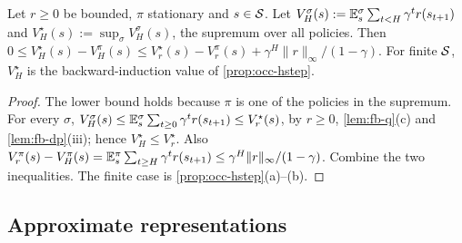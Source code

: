 \begin{corollary}\label{cor:fb-hstep}
Let $r\ge0$ be bounded, $\pi$ stationary and $s\in\mathcal{S}$.
Let $V^\sigma_H(s):=\mathbb{E}^\sigma_s\sum_{t<H}\gamma^tr(s_{t+1})$ and $V^\star_H(s):=\sup_\sigma V^\sigma_H(s)$, the supremum over all policies.
Then $0\le V^\star_H(s)-V^\pi_H(s)\le V^\star_r(s)-V^\pi_r(s)+\gamma^H\|r\|_\infty/(1-\gamma)$.
For finite $\mathcal{S}$, $V^\star_H$ is the backward-induction value of \cref{prop:occ-hstep}.
\end{corollary}
\begin{proof}
The lower bound holds because $\pi$ is one of the policies in the supremum.
For every $\sigma$, $V^\sigma_H(s)\le\mathbb{E}^\sigma_s\sum_{t\ge0}\gamma^tr(s_{t+1})\le V^\star_r(s)$, by $r\ge0$, \cref{lem:fb-q}(c) and \cref{lem:fb-dp}(iii); hence $V^\star_H\le V^\star_r$.
Also $V^\pi_r(s)-V^\pi_H(s)=\mathbb{E}^\pi_s\sum_{t\ge H}\gamma^tr(s_{t+1})\le\gamma^H\|r\|_\infty/(1-\gamma)$.
Combine the two inequalities. The finite case is \cref{prop:occ-hstep}(a)--(b).
\end{proof}

\subsection{Approximate representations}\label{sec:fb-approx}

